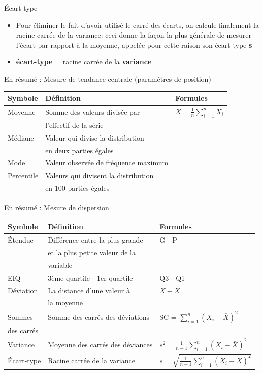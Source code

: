 \documentclass[
  ignorenonframetext,
]{beamer}
\begin{document}
\begin{frame}{Écart type}
\protect\hypertarget{uxe9cart-type}{}
\begin{itemize}
\item
  Pour éliminer le fait d'avoir utilisé le carré des écarts, on calcule
  finalement la racine carrée de la variance: ceci donne la façon la
  plus générale de mesurer l'écart par rapport à la moyenne, appelée
  pour cette raison son écart type \textbf{s}
\item
  \textbf{écart-type} = racine carrée de la \textbf{variance}
\end{itemize}
\end{frame}

\begin{frame}{En résumé : Mesure de tendance centrale (paramètres de
position)}
\protect\hypertarget{en-ruxe9sumuxe9-mesure-de-tendance-centrale-paramuxe8tres-de-position}{}
\begin{longtable}[]{@{}lll@{}}
\toprule()
Symbole & Définition & Formules \\
\midrule()
\endhead
Moyenne & Somme des valeurs divisée par &
\(\bar{X} = \frac{1}{n} \sum_{i=1}^n X_i\) \\
& l'effectif de la série & \\
Médiane & Valeur qui divise la distribution & \\
& en deux parties égales & \\
Mode & Valeur observée de fréquence maximum & \\
Percentile & Valeurs qui divisent la distribution & \\
& en 100 parties égales & \\
\bottomrule()
\end{longtable}
\end{frame}

\begin{frame}{En résumé : Mesure de dispersion}
\protect\hypertarget{en-ruxe9sumuxe9-mesure-de-dispersion}{}
\begin{longtable}[]{@{}lll@{}}
\toprule()
Symbole & Définition & Formules \\
\midrule()
\endhead
Étendue & Différence entre la plus grande & G - P \\
& et la plus petite valeur de la & \\
& variable & \\
EIQ & 3ème quartile - 1er quartile & Q3 - Q1 \\
Déviation & La distance d'une valeur à & \(X - \bar{X}\) \\
& la moyenne & \\
Sommes & Somme des carrés des déviations & SC =
\(\sum_{i=1}^n (X_i - \bar{X})^2\) \\
des carrés & & \\
Variance & Moyenne des carrés des déviances &
\(s^2 = \frac{1}{n-1} \sum_{i=1}^n (X_i - \bar{X})^2\) \\
Écart-type & Racine carrée de la variance &
\(s = \sqrt{\frac{1}{n-1} \sum_{i=1}^n (X_i - \bar{X})^2}\) \\
\bottomrule()
\end{longtable}
\end{frame}
\end{document}
